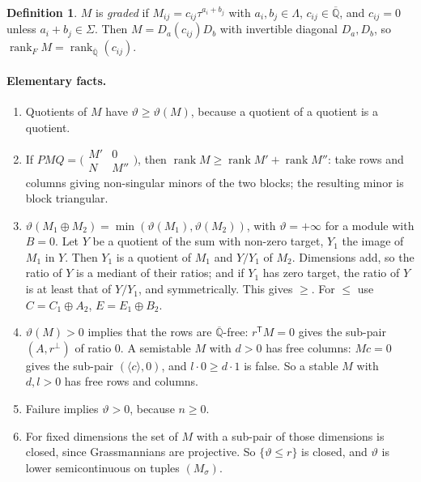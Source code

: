 \documentclass[11pt,a4paper]{article}
\theoremstyle{plain}
\theoremstyle{definition}
\newtheorem{definition}[lemma]{Definition}
\newcommand{\Qbar}{\overline{\mathbb{Q}}}
\newcommand{\rk}{\operatorname{rank}}
\newcommand{\vth}{\vartheta}
\begin{document}
\begin{definition}
$M$ is \emph{graded} if $M_{ij}=c_{ij}\tau^{a_{i}+b_{j}}$ with $a_{i},b_{j}\in\Lambda$, $c_{ij}\in\Qbar$, and $c_{ij}=0$ unless
$a_{i}+b_{j}\in\Sigma$. Then $M=D_{a}(c_{ij})D_{b}$ with invertible diagonal $D_{a},D_{b}$, so $\rk_{F}M=\rk_{\Qbar}(c_{ij})$.
\end{definition}

\paragraph{Elementary facts.}
\begin{enumerate}[label=(\alph*)]
\item Quotients of $M$ have $\vth\ge\vth(M)$, because a quotient of a quotient is a quotient.
\item If $PMQ=\bigl(\begin{smallmatrix}M'&0\\N&M''\end{smallmatrix}\bigr)$, then $\rk M\ge\rk M'+\rk M''$: take rows and columns giving
non-singular minors of the two blocks; the resulting minor is block triangular.
\item $\vth(M_{1}\oplus M_{2})=\min(\vth(M_{1}),\vth(M_{2}))$, with $\vth=+\infty$ for a module with $B=0$. Let $Y$ be a quotient of
the sum with non-zero target, $Y_{1}$ the image of $M_{1}$ in $Y$. Then $Y_{1}$ is a quotient of $M_{1}$ and $Y/Y_{1}$ of $M_{2}$. Dimensions
add, so the ratio of $Y$ is a mediant of their ratios; and if $Y_{1}$ has zero target, the ratio of $Y$ is at least that of $Y/Y_{1}$, and
symmetrically. This gives $\ge$. For $\le$ use $C=C_{1}\oplus A_{2}$, $E=E_{1}\oplus B_{2}$.
\item $\vth(M)>0$ implies that the rows are $\Qbar$-free: $r^{\mathsf T}M=0$ gives the sub-pair $(A,r^{\perp})$ of ratio $0$. A semistable $M$ with
$d>0$ has free columns: $Mc=0$ gives the sub-pair $(\langle c\rangle,0)$, and $l\cdot0\ge d\cdot1$ is false. So a stable $M$ with $d,l>0$ has free
rows and columns.
\item Failure implies $\vth>0$, because $n\ge0$.
\item For fixed dimensions the set of $M$ with a sub-pair of those dimensions is closed, since Grassmannians are projective. So
$\{\vth\le r\}$ is closed, and $\vth$ is lower semicontinuous on tuples $(M_{\sigma})$.
\end{enumerate}
\end{document}

